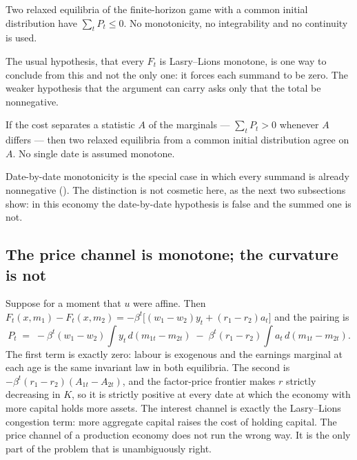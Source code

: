 \begin{theorem}\label{thm:mfgengine}
Two relaxed equilibria of the finite-horizon game with a common initial distribution have
$\sum_t P_t\le 0$. No monotonicity, no integrability and no continuity is used.
\end{theorem}

The usual hypothesis, that every $F_t$ is Lasry--Lions monotone, is one way to conclude from this
and not the only one: it forces each summand to be zero. The weaker hypothesis that the argument
can carry asks only that the total be nonnegative.

\begin{theorem}\label{thm:mfgagg}
If the cost separates a statistic $A$ of the marginals --- $\sum_tP_t>0$ whenever $A$ differs ---
then two relaxed equilibria from a common initial distribution agree on $A$. No single date is
assumed monotone.
\end{theorem}

Date-by-date monotonicity is the special case in which every summand is already nonnegative
(). The distinction is not cosmetic here, as the next
two subsections show: in this economy the date-by-date hypothesis is false and the summed one is
not.

\subsection{The price channel is monotone; the curvature is not}

Suppose for a moment that $u$ were affine. Then
$F_t(x,m_1)-F_t(x,m_2)=-\beta^t\bigl[(w_1-w_2)y_t+(r_1-r_2)a_t\bigr]$ and the pairing is
\[
  P_t \;=\; -\beta^t (w_1-w_2)\!\int\! y_t\,d(m_{1t}-m_{2t})
        \;-\;\beta^t (r_1-r_2)\!\int\! a_t\,d(m_{1t}-m_{2t}).
\]
The first term is exactly zero: labour is exogenous and the earnings marginal at each age is the
same invariant law in both equilibria. The second is $-\beta^t(r_1-r_2)(A_{1t}-A_{2t})$, and the
factor-price frontier makes $r$ strictly decreasing in $K$, so it is strictly positive at every
date at which the economy with more capital holds more assets. The interest channel is exactly the
Lasry--Lions congestion term: more aggregate capital raises the cost of holding capital. The price
channel of a production economy does not run the wrong way. It is the only part of the problem
that is unambiguously right.

